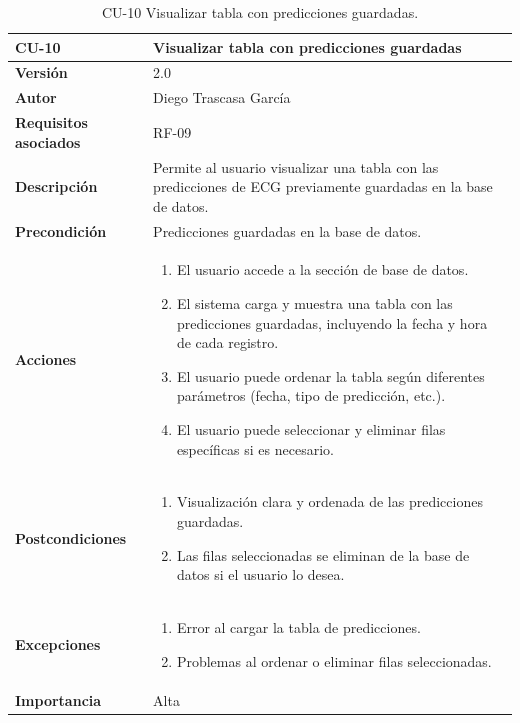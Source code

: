 \begin{table}[p]
	\centering
	\begin{tabularx}{\linewidth}{ p{} p{} }
		\toprule
		\textbf{CU-10}    & \textbf{Visualizar tabla con predicciones guardadas}\\
		\toprule
		\textbf{Versión}              & 2.0    \\
		\textbf{Autor}                & Diego Trascasa García \\
		\textbf{Requisitos asociados} & RF-09 \\
		\textbf{Descripción}          & Permite al usuario visualizar una tabla con las predicciones de ECG previamente guardadas en la base de datos. \\
		\textbf{Precondición}         & Predicciones guardadas en la base de datos. \\
		\textbf{Acciones}             &
		\begin{enumerate}
			\item El usuario accede a la sección de base de datos.
			\item El sistema carga y muestra una tabla con las predicciones guardadas, incluyendo la fecha y hora de cada registro.
			\item El usuario puede ordenar la tabla según diferentes parámetros (fecha, tipo de predicción, etc.).
			\item El usuario puede seleccionar y eliminar filas específicas si es necesario.
		\end{enumerate}\\
		\textbf{Postcondiciones}      & 
		\begin{enumerate}
			\item Visualización clara y ordenada de las predicciones guardadas.
			\item Las filas seleccionadas se eliminan de la base de datos si el usuario lo desea.
		\end{enumerate}\\
		\textbf{Excepciones}          & 
		\begin{enumerate}
			\item Error al cargar la tabla de predicciones.
			\item Problemas al ordenar o eliminar filas seleccionadas.
		\end{enumerate}\\
		\textbf{Importancia}          & Alta \\
		\bottomrule
	\end{tabularx}
	\caption{CU-10 Visualizar tabla con predicciones guardadas.}
    \label{CU-10}
\end{table}

